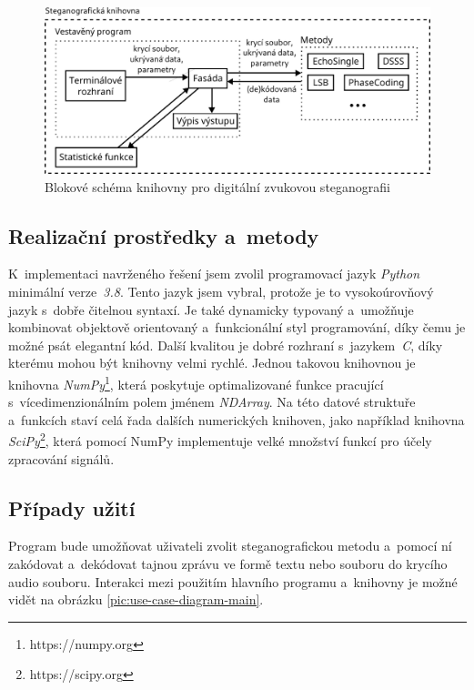 \begin{figure}[hbt]
    \centering
    \includegraphics[width=\textwidth]{obrazky/block-diagram.pdf}
    \caption{Blokové schéma knihovny pro digitální zvukovou steganografii}
    \label{pic:library-block-diagram}
\end{figure}

\subsection*{Realizační prostředky a~metody}
\label{sub:solution-tool-choices}

K~implementaci navrženého řešení jsem zvolil programovací jazyk \textit{Python}
minimální verze~\textit{3.8}. Tento jazyk jsem vybral, protože je to
vysokoúrovňový jazyk s~dobře čitelnou syntaxí. Je také dynamicky typovaný
a~umožňuje kombinovat objektově orientovaný a~funkcionální styl programování,
díky čemu je možné psát elegantní kód. Další kvalitou je dobré rozhraní
s~jazykem~\textit{C}, díky kterému mohou být knihovny velmi rychlé. Jednou
takovou knihovnou je knihovna \textit{NumPy}\footnote{https://numpy.org}, která
poskytuje optimalizované funkce pracující s~vícedimenzionálním polem jménem
\textit{NDArray}. Na této datové struktuře a~funkcích staví celá řada dalších
numerických knihoven, jako například knihovna
\textit{SciPy}\footnote{https://scipy.org}, která pomocí NumPy implementuje
velké množství funkcí pro účely zpracování signálů.

\subsection*{Případy užití}
\label{sub:use-cases}

Program bude umožňovat uživateli zvolit steganografickou metodu a~pomocí ní
zakódovat a~dekódovat tajnou zprávu ve formě textu nebo souboru do krycího
audio souboru. Interakci mezi použitím hlavního programu a~knihovny je možné
vidět na obrázku \ref{pic:use-case-diagram-main}.

